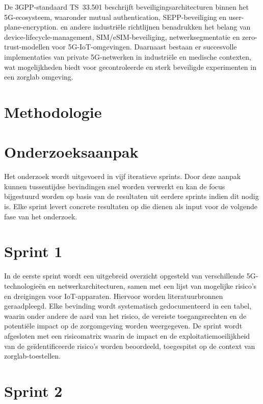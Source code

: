De 3GPP-standaard TS~33.501 \autocite{3GPP2024} beschrijft beveiligingsarchitecturen binnen het 5G-ecosysteem, waaronder mutual authentication, SEPP-beveiliging en user-plane-encryption. \textcite{IBMSecurity2023} en andere industriële richtlijnen benadrukken het belang van device-lifecycle-management, SIM/eSIM-beveiliging, netwerksegmentatie en zero-trust-modellen voor 5G-IoT-omgevingen. Daarnaast bestaan er succesvolle implementaties van private 5G-netwerken in industriële en medische contexten, wat mogelijkheden biedt voor gecontroleerde en sterk beveiligde experimenten in een zorglab omgeving.


\section{Methodologie}%
\label{sec:methodologie}

\section*{Onderzoeksaanpak}

Het onderzoek wordt uitgevoerd in vijf iteratieve sprints. Door deze aanpak kunnen tussentijdse bevindingen snel worden verwerkt en kan de focus bijgestuurd worden op basis van de resultaten uit eerdere sprints indien dit nodig is. Elke sprint levert concrete resultaten op die dienen als input voor de volgende fase van het onderzoek.

\section*{Sprint 1}

In de eerste sprint wordt een uitgebreid overzicht opgesteld van verschillende 5G-technologieën en netwerkarchitecturen, samen met een lijst van mogelijke risico’s en dreigingen voor IoT-apparaten. Hiervoor worden literatuurbronnen geraadpleegd. Elke bevinding wordt systematisch gedocumenteerd in een tabel, waarin onder andere de aard van het risico, de vereiste toegangsrechten en de potentiële impact op de zorgomgeving worden weergegeven. De sprint wordt afgesloten met een risicomatrix waarin de impact en de exploitatiemoeilijkheid van de geïdentificeerde risico’s worden beoordeeld, toegespitst op de context van zorglab-toestellen.

\section*{Sprint 2}

